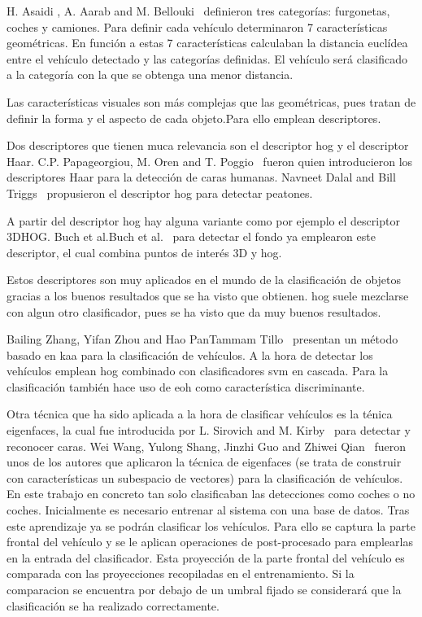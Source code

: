 H. Asaidi , A. Aarab and M. Bellouki~\cite{shadow_elimination} definieron tres categorías: furgonetas, coches y camiones. Para definir cada vehículo determinaron 7 características geométricas. En función a estas 7 características calculaban la distancia euclídea entre el vehículo detectado y las categorías definidas. El vehículo será clasificado a la categoría con la que se obtenga una menor distancia.

Las características visuales son más complejas que las geométricas, pues tratan de definir la forma y el aspecto de cada objeto.Para ello emplean descriptores.

Dos descriptores que tienen muca relevancia son el descriptor \acrfull{hog} y el descriptor Haar. C.P. Papageorgiou, M. Oren and T. Poggio~\cite{haar_paper} fueron quien introducieron los descriptores Haar para la detección de caras humanas. Navneet Dalal and Bill Triggs~\cite{hog_paper} propusieron el descriptor \acrshort{hog} para detectar peatones.

A partir del descriptor \acrshort{hog} hay alguna variante como por ejemplo el descriptor 3DHOG. Buch et al.Buch et al.~\cite{3dhog_article}  para detectar el fondo ya emplearon este descriptor, el cual combina puntos de interés 3D y \acrshort{hog}.

Estos descriptores son muy aplicados en el mundo de la clasificación de objetos gracias a los buenos resultados que se ha visto que obtienen. \acrshort{hog} suele mezclarse con algun otro clasificador, pues se ha visto que da muy buenos resultados.

Bailing Zhang, Yifan Zhou and Hao PanTammam Tillo~\cite{hybrid_model} presentan un método basado en \acrfull{kaa} para la clasificación de vehículos. A la hora de detectar los vehículos emplean \acrshort{hog} combinado con clasificadores \acrfull{svm} en cascada. Para la clasificación también hace uso de \acrfull{eoh} como característica discriminante.

Otra técnica que ha sido aplicada a la hora de clasificar vehículos es la ténica eigenfaces, la cual fue introducida por L. Sirovich and M. Kirby~\cite{low_dimensional} para detectar y reconocer caras. Wei Wang, Yulong Shang, Jinzhi Guo and Zhiwei Qian~\cite{real_time_vehicle} fueron unos de los autores que aplicaron la técnica de eigenfaces (se trata de construir con características un subespacio de vectores) para la clasificación de vehículos. En este trabajo en concreto tan solo clasificaban las detecciones como coches o no coches. Inicialmente es necesario entrenar al sistema con una base de datos. Tras este aprendizaje ya se podrán clasificar los vehículos. Para ello se captura la parte frontal del vehículo y se le aplican operaciones de post-procesado para emplearlas en la entrada del clasificador. Esta proyección de la parte frontal del vehículo es comparada con las proyecciones recopiladas en el entrenamiento. Si la comparacion se encuentra por debajo de un umbral fijado se considerará que la clasificación se ha realizado correctamente. 

